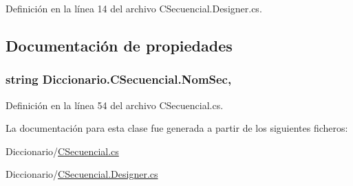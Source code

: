 Definición en la línea 14 del archivo C\-Secuencial.\-Designer.\-cs.



\subsection{Documentación de propiedades}
\hypertarget{class_diccionario_1_1_c_secuencial_a4a21e095e189f2569dcf83fcfc3eb18e}{
\subsubsection[{Nom\-Sec}]{\setlength{\rightskip}{0pt plus 5cm}string Diccionario.\-C\-Secuencial.\-Nom\-Sec\hspace{0.3cm}{\ttfamily [get]}, {\ttfamily [set]}}}\label{class_diccionario_1_1_c_secuencial_a4a21e095e189f2569dcf83fcfc3eb18e}


Definición en la línea 54 del archivo C\-Secuencial.\-cs.



La documentación para esta clase fue generada a partir de los siguientes ficheros\-:\begin{DoxyCompactItemize}
\item 
Diccionario/\hyperlink{_c_secuencial_8cs}{C\-Secuencial.\-cs}\item 
Diccionario/\hyperlink{_c_secuencial_8_designer_8cs}{C\-Secuencial.\-Designer.\-cs}\end{DoxyCompactItemize}
